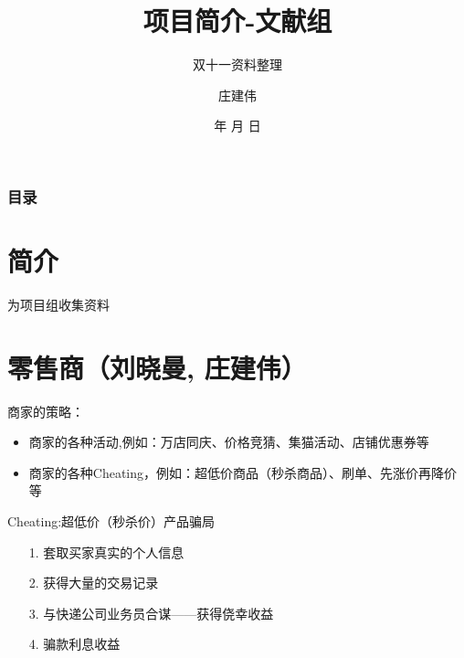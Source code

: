 \documentclass{beamer}
\begin{document}
\title{项目简介-文献组}
\subtitle{双十一资料整理}

\author{庄建伟}


\renewcommand{\today}{\number\year 年 \number\month 月 \number\day 日}
\date{\today}

\subject{Presentations}

\begin{frame}
\titlepage
\end{frame}

\begin{frame}
\frametitle{目录}
\begin{multicols}
\tableofcontents
\end{multicols}
\end{frame}

\section{简介\ \ \ \ \ \ \ \ \ \ \ \ \ \ \ \ \ \ \ \ \ \ \ \ \ \ \ }
\begin{frame}\huge
\begin{center}
为项目组收集资料
\end{center}
\end{frame}


\section{零售商（刘晓曼, 庄建伟）}
\begin{frame}
商家的策略：
\begin{itemize}
\item 商家的各种活动,例如：万店同庆、价格竞猜、集猫活动、店铺优惠券等
\item 商家的各种Cheating，例如：超低价商品（秒杀商品）、刷单、先涨价再降价等
\end{itemize}
\end{frame}
\begin{frame}
Cheating:超低价（秒杀价）产品骗局
\begin{itemize}
\item[1.] 套取买家真实的个人信息
\item[2.] 获得大量的交易记录
\item[3.] 与快递公司业务员合谋——获得侥幸收益
\item[4.] 骗款利息收益
\end{itemize}
\end{frame}
\end{document}
